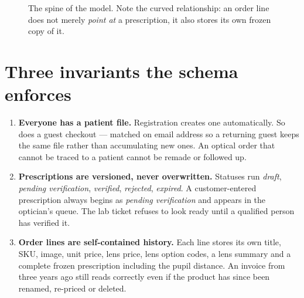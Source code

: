 \documentclass[11pt,a4paper]{report}
\begin{document}
\begin{figure}[H]
\centering
{}
\caption{The spine of the model. Note the curved relationship: an order line
does not merely \emph{point at} a prescription, it also stores its own frozen
copy of it.}
\end{figure}

\section{Three invariants the schema enforces}

\begin{enumerate}
  \item \textbf{Everyone has a patient file.} Registration creates one
        automatically. So does a guest checkout --- matched on email address so
        a returning guest keeps the same file rather than accumulating new
        ones. An optical order that cannot be traced to a patient cannot be
        remade or followed up.

  \item \textbf{Prescriptions are versioned, never overwritten.} Statuses run
        \emph{draft}, \emph{pending verification}, \emph{verified},
        \emph{rejected}, \emph{expired}. A customer-entered prescription
        always begins as \emph{pending verification} and appears in the
        optician's queue. The lab ticket refuses to look ready until a
        qualified person has verified it.

  \item \textbf{Order lines are self-contained history.} Each line stores its
        own title, SKU, image, unit price, lens price, lens option codes, a
        lens summary and a complete frozen prescription including the pupil
        distance. An invoice from three years ago still reads correctly even
        if the product has since been renamed, re-priced or deleted.
\end{enumerate}
\end{document}
